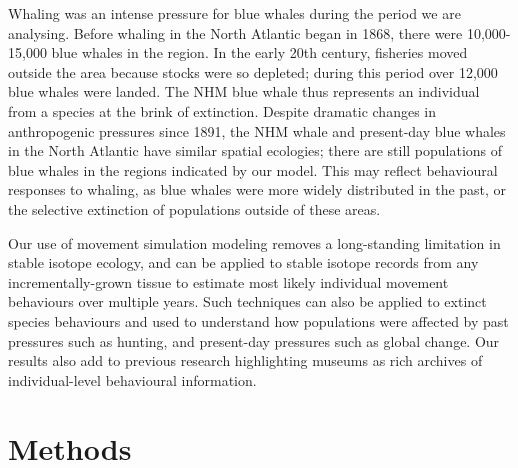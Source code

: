 \documentclass[a4paper,12pt]{article}
\begin{document}
Whaling was an intense pressure for blue whales during the period we are analysing. 
Before whaling in the North Atlantic began in 1868\cite{reilly2008balaenoptera}, there were 10,000-15,000 blue whales in the region\cite{sigurjonsson1995life}. 
In the early 20th century, fisheries moved outside the area because stocks were so depleted\cite{reilly2008balaenoptera}; during this period over 12,000 blue whales were landed\cite{sigurjonsson1995life}. 
The NHM blue whale thus represents an individual from a species at the brink of extinction.
Despite dramatic changes in anthropogenic pressures since 1891, the NHM whale and present-day blue whales in the North Atlantic have similar spatial ecologies; there are still populations of blue whales in the regions indicated by our model. This may reflect behavioural responses to whaling, as blue whales were more widely distributed in the past\cite{reeves2004historical}, or the selective extinction of populations outside of these areas.

Our use of movement simulation modeling removes a long-standing limitation in stable isotope ecology, and can be applied to stable isotope records from any incrementally-grown tissue to estimate most likely individual movement behaviours over multiple years. 
Such techniques can also be applied to extinct species behaviours and used to understand how populations were affected by past pressures such as hunting, and present-day pressures such as global change. 
Our results also add to previous research\cite{lister2011natural,ryan2013stable} highlighting museums as rich archives of individual-level behavioural information.

\section{Methods}
\end{document}
